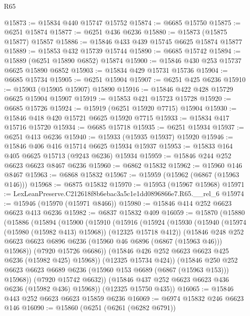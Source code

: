 \begin{lexlean}{R65}
\begin{coremodule}
{@15873 := @15834 @440 @15747 @15752
@15874 := @6685 @15750
@15875 := @6251 @15874
@15877 := @6251 @436 @6236
@15880 := @15873 (@15875 @15877) @15857
@15886 := @15846 @433 @439 @15745 @6625 @15874 @15877
@15889 := @15853 @432 @15739 @15744
@15890 := @6685 @15742
@15894 := @15889 (@6251 @15890 @6852) @15874
@15900 := @15846 @430 @253 @15737 @6625 @15890 @6852
@15903 := @15834 @429 @15731 @15736
@15904 := @6685 @15734
@15905 := @6251 @15904
@15907 := @6251 @425 @6236
@15910 := @15903 (@15905 @15907) @15890
@15916 := @15846 @422 @428 @15729 @6625 @15904 @15907
@15919 := @15853 @421 @15723 @15728
@15920 := @6685 @15726
@15924 := @15919 (@6251 @15920 @7715) @15904
@15930 := @15846 @418 @420 @15721 @6625 @15920 @7715
@15933 := @15834 @417 @15716 @15720
@15934 := @6685 @15718
@15935 := @6251 @15934
@15937 := @6251 @413 @6236
@15940 := @15933 (@15935 @15937) @15920
@15946 := @15846 @406 @416 @15714 @6625 @15934 @15937
@15953 := @15833 @164 @405 @6625 @15713 (@9243 @6236) @15934
@15959 := @15846 @244 @252 @6623 @6623 @8467 @6236
@15960 := @6862 @15832
@15962 := @15960 @146 @8467
@15963 := @6868 @15832
@15967 := @15959 (@15962 (@6867 (@15963 @146)))
@15968 := @6875 @15832
@15970 := @15953 (@15967 @15968)
@15971 := LexLeanPreserve.C212618f8b6ebac3a5c1e1dd0896866e7.R65.__rel_6
@15974 := @15946 (@15970 (@15971 @8466))
@15980 := @15846 @414 @252 @6623 @6623 @413 @6236
@15982 := @6837 @15832 @409
@16059 := @15870
    (@15880
      (@15886
        (@15894
          (@15900
            (@15910
              (@15916
                (@15924
                  (@15930
                    (@15940 (@15974 (@15980 (@15982 @413) @15968)) (@12325 @15718 @412))
                    (@15846
                      @248
                      @252
                      @6623
                      @6623
                      @6896
                      @6236
                      (@15960 @46 @6896 (@6867 (@15963 @46)))
                      @15968))
                  (@7920 @15726 @6686))
                (@15846 @426 @252 @6623 @6623 @425 @6236 (@15982 @425) @15968))
              (@12325 @15734 @424))
            (@15846
              @250
              @252
              @6623
              @6623
              @6689
              @6236
              (@15960 @153 @6689 (@6867 (@15963 @153)))
              @15968))
          (@7920 @15742 @6632))
        (@15846 @437 @252 @6623 @6623 @436 @6236 (@15982 @436) @15968))
      (@12325 @15750 @435))
@16065 := @15846 @443 @252 @6623 @6623 @15859 @6236
@16069 := @6974 @15832 @246 @6623 @146
@16090 := @15860
    (@6251
      (@6261 (@6282 @6791))
}
\end{coremodule}
\end{lexlean}
